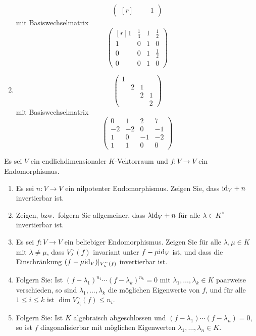 \documentclass[a4paper,10pt]{scrartcl}
\begin{document}
\begin{solution}
\begin{enumerate}
\[\begin{pmatrix*}[r]
              &     &   & 1
        \end{pmatrix*}
      \]
      mit Basiswechselmatrix
      \[
        \begin{pmatrix*}[r]
          1 & \frac{1}{4} & 1 & \frac{1}{2} \\
          1 & 0           & 1 & 0           \\
          0 & 0           & 1 & \frac{1}{2} \\
          0 & 0           & 1 & 0
        \end{pmatrix*}
      \]
    \item
      \[
        \begin{pmatrix}
          1 &   &   &   \\
            & 2 & 1 &   \\
            &   & 2 & 1 \\
            &   &   & 2
        \end{pmatrix}
      \]
      mit Basiswechselmatrix
      \[
        \begin{pmatrix}
           0  &  1  &  2  &  7  \\
          -2  & -2  &  0  & -1  \\
           1  &  0  & -1  & -2  \\
           1  &  1  &  0  &  0
        \end{pmatrix}
      \]
  \end{enumerate}
\end{solution}


\begin{question}
  Es sei $V$ ein endlichdimensionaler $K$-Vektorraum und $f \colon V \to V$ ein Endomorphismus.
  \begin{enumerate}[leftmargin=*]
    \item
      Es sei $n \colon V \to V$ ein nilpotenter Endomorphismus.
      Zeigen Sie, dass ${\operatorname{id}_V} + n$ invertierbar ist.
    \item
      Zeigen, bzw.\ folgern Sie allgemeiner, dass $\lambda {\operatorname{id}_V} + n$ für alle $\lambda \in K^\times$ invertierbar ist.
    \item
      Es sei $f \colon V \to V$ ein beliebiger Endomorphismus.
      Zeigen Sie für alle $\lambda, \mu \in K$ mit $\lambda \neq \mu$, dass $V^\sim_\lambda(f)$ invariant unter $f - \mu {\operatorname{id}_V}$ ist, und dass die Einschränkung $(f - \mu {\operatorname{id}_V})|_{V^\sim_\lambda(f)}$ invertierbar ist.
    \item
      Folgern Sie:
      Ist $(f - \lambda_1)^{n_1} \dotsm (f - \lambda_k)^{n_k} = 0$ mit $\lambda_1, \dotsc, \lambda_k \in K$ paarweise verschieden, so sind $\lambda_1, \dotsc, \lambda_k$ die möglichen Eigenwerte von $f$, und für alle $1 \leq i \leq k$ ist $\dim V^\sim_{\lambda_i}(f) \leq n_i$.
    \item
      Folgern Sie:
      Ist $K$ algebraisch abgeschlossen und $(f - \lambda_1) \dotsm (f - \lambda_n) = 0$, so ist $f$ diagonalisierbar mit möglichen Eigenwerten $\lambda_1, \dotsc, \lambda_n \in K$.
  \end{enumerate}
\end{question}
\end{document}

